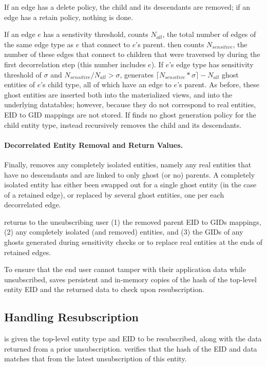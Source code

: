 If an edge has a delete policy, the child and its descendants are removed; if an edge has a retain
policy, nothing is done.
%

If an edge $e$ has a senstivity threshold,
\name counts $N_{all}$, the total number of edges of the same edge type as $e$ that connect to $e$'s parent.
\name then counts $N_{sensitive}$, the number of these edges that connect to children that were traversed by \name during the
first decorrelation step (this number includes $e$).
If $e$'s edge type has sensitivity threshold of $\sigma$ and $N_{sensitive} / N_{all} > \sigma$,
\name generates $\lceil N_{sensitive}*\sigma\rceil - N_{all}$ ghost entities of $e$'s child type, all
of which have an edge to $e$'s parent.
As before, these ghost entities are inserted both into the materialized views, and into the underlying
datatables; however, because they do not correspond to real entities, EID to GID mappings are not
stored.
If \name finds no ghost generation policy for the child entity type, \name instead recursively
removes the child and its descendants.

\paragraph{Decorrelated Entity Removal and Return Values.}
Finally, \name removes any completely isolated entities, namely any real entities that have no
descendants and are linked to only ghost (or no) parents. A completely isolated entity has either been swapped
out for a single ghost entity (in the case of a retained edge), or replaced by several ghost
entities, one per each decorrelated edge.

\name returns to the unsubscribing user (1) the removed parent EID to GIDs mappings, (2) any
completely isolated (and removed) entities,
and (3) the GIDs of any ghosts generated during sensitivity checks or to replace real
entities at the ends of retained edges.

To ensure that the end user cannot tamper with their application data while unsubscribed, \name saves
persistent and in-memory copies of the hash of the top-level entity EID and the returned data to
check upon resubscription.

\subsection{Handling Resubscription}
\name is given the top-level entity type and EID to be resubscribed, along with the data returned
from a prior unsubscription.
\name verifies that the hash of the EID and data matches that from the latest unsubscription of
this entity.

